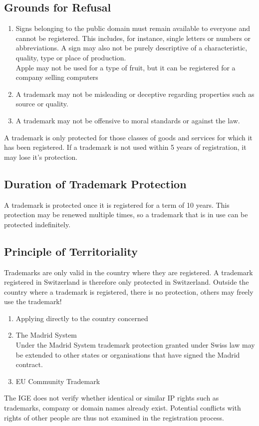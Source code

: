 \documentclass[11pt]{article}
\theoremstyle{definition}
\begin{document}
\subsection{Grounds for Refusal}
\begin{enumerate}
	\item Signs belonging to the public domain must remain available to everyone and cannot be registered. This includes, for instance, single letters or numbers or abbreviations. A sign may also not be purely descriptive of a characteristic, quality, type or place of production.\\
	Apple may not be used for a type of fruit, but it can be registered for a company selling computers
	\item A trademark may not be misleading or deceptive regarding properties such as source or quality.
	\item A trademark may not be offensive to moral standards or against the law.
\end{enumerate}

A trademark is only protected for those classes of goods and services for which it has been registered. If a trademark is not used within 5 years of registration, it may lose it's protection.

\subsection{Duration of Trademark Protection}
A trademark is protected once it is registered for a term of 10 years. This protection may be renewed multiple times, so a trademark that is in use can be protected indefinitely.

\subsection{Principle of Territoriality}
Trademarks are only valid in the country where they are registered. A trademark registered in Switzerland is therefore only protected in Switzerland. Outside the country where a trademark is registered, there is no protection, others may freely use the trademark!

\begin{enumerate}
	\item Applying directly to the country concerned
	\item The Madrid System\\
	Under the Madrid System trademark protection granted under Swiss law may be extended to other states or organisations that have signed the Madrid contract.
	\item EU Community Trademark
\end{enumerate}
The IGE does not verify whether identical or similar IP rights such as trademarks, company or domain names already exist. Potential conflicts with rights of other people are thus not examined in the registration process.
\end{document}
